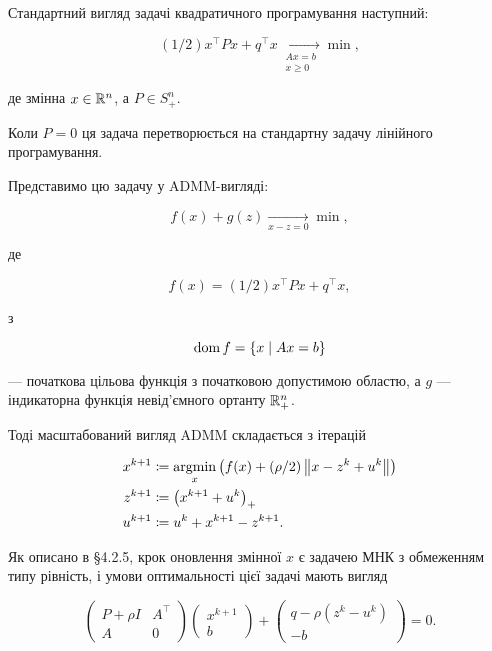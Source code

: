 Стандартний вигляд задачі квадратичного програмування наступний:

\begin{equation}
	\label{eq:standard-quadratic-programming-problem}
	(1/2) x^\intercal P x + q^\intercal x \xrightarrow[\substack{A x = b \\ x \ge 0}]{} \min,
\end{equation}

де змінна $x \in \mathbb{R}^n$, а $P \in S_+^n$. 

\begin{remark}
	Коли $P = 0$ ця задача перетворюється на стандартну задачу лінійного програмування.
\end{remark}

Представимо цю задачу у ADMM-вигляді:

\begin{equation}
	f(x) + g(z) \xrightarrow[x - z = 0]{} \min,
\end{equation}

де 

\begin{equation}
	f(x) = (1/2) x^\intercal P x + q^\intercal x,
\end{equation}

з

\begin{equation}
	\operatorname{dom} f = \{ x \mid A x = b \}
\end{equation}

--- початкова цільова функція з початковою допустимою областю, а $g$ --- індикаторна функція невід'ємного ортанту $\mathbb{R}_+^n$. \medskip

Тоді масштабований вигляд ADMM складається з ітерацій

\begin{align}
	x^{k + 1} &\coloneqq \operatorname*{argmin}_x \left( f(x) + (\rho / 2) \left\|x - z^k + u^k \right\| \right) \\
	z^{k + 1} &\coloneqq \left( x^{k + 1} + u^k \right)_+ \\
	u^{k + 1} &\coloneqq u^k + x^{k + 1} - z^{k + 1}.
\end{align}

Як описано в \S4.2.5, крок оновлення змінної $x$ є задачею МНК з обмеженням типу рівність, і умови оптимальності цієї задачі мають вигляд

\begin{equation}
	\begin{pmatrix}
		P + \rho I & A^\intercal \\
		A & 0
	\end{pmatrix}
	\begin{pmatrix}
		x^{k + 1} \\
		b
	\end{pmatrix}
	+
	\begin{pmatrix}
		q - \rho \left( z^k - u^k \right) \\
		- b
	\end{pmatrix}
	= 
	0.
\end{equation}

